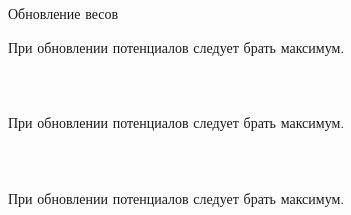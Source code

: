 \documentclass[russian, hyperref={unicode}]{beamer}
\begin{document}
\begin{frame}[noframenumbering]{Обновление весов}
{        \begin{center}
            При обновлении потенциалов следует брать максимум.
        \end{center}
    }
   
     {
        \begin{columns}
            \begin{figure}
            \end{figure}

            \begin{figure}
            \end{figure}
        \end{columns}
        
        \begin{center}
            При обновлении потенциалов следует брать максимум.
        \end{center}
    }
   
     {
        \begin{columns}
            \begin{figure}
            \end{figure}

            \begin{figure}
            \end{figure}
        \end{columns}
        
        \begin{center}
            При обновлении потенциалов следует брать максимум.
        \end{center}
    }
   
     {
        \begin{columns}
            \begin{figure}
            \end{figure}

            \begin{figure}
            \end{figure}
        \end{columns}
        
}
\end{frame}
\end{document}
